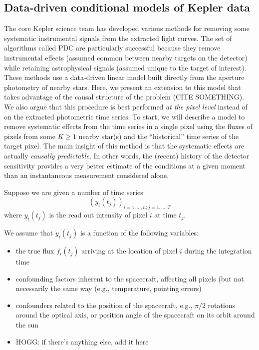\documentclass[letterpaper,12pt,preprint]{aastex}
\begin{document}
\subsection{Data-driven conditional models of Kepler data}

The core Kepler science team has developed various methods for removing some
systematic instrumental signals from the extracted light curves.
The set of algorithms called PDC \citep{map-pdc1,map-pdc2} are particularly
successful because they remove instrumental effects (assumed common between
nearby targets on the detector) while retaining astrophysical signals (assumed
unique to the target of interest).
These methods use a data-driven linear model built directly from the aperture
photometry of nearby stars.
Here, we present an extension to this model that takes advantage of the causal
structure of the problem (CITE SOMETHING).
We also argue that this procedure is best performed \emph{at the pixel level}
instead of on the extracted photometric time series.
To start, we will describe a model to remove systematic effects from the time
series in a single pixel using the fluxes of pixels from some $K\ge1$ nearby
star(s) and the ``historical'' time series of the target pixel.
The main insight of this method is that the systematic effects are actually
\emph{causally predictable}.
In other words, the (recent) history of the detector sensitivity provides a
very better estimate of the conditions at a given moment than an
instantaneous measurement considered alone.

Suppose we are given a number of time series
$$(y_i(t_j))_{i=1,\dots,n; j=1,\dots,T}$$
where $y_i(t_j)$ is the read out intensity of pixel $i$ at time $t_j$.

We assume that $y_i(t_j)$ is a function of the following variables:
\begin{itemize}
\item
the true flux $f_i(t_j)$ arriving at the location of pixel $i$ during the
integration time
\item
confounding factors inherent to the spacecraft, affecting all pixels (but not
necessarily the same way (e.g., temperature, pointing errors)
\item
confounders related to the position of the spacecraft, e.g., $\pi/2$ rotations
around the optical axis, or position angle of the spacecraft on its orbit
around the sun
\item
HOGG: if there's anything else, add it here
\end{itemize}
\end{document}
